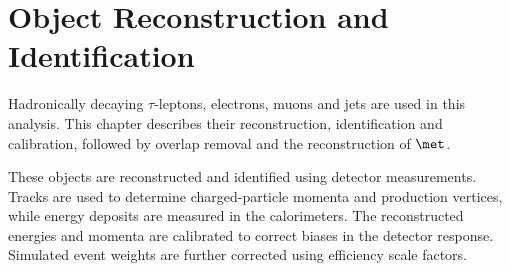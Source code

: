 \chapter{Object Reconstruction and Identification}
\label{chapter:object_reconstruction}

Hadronically decaying $\tau$-leptons, electrons, muons and jets are used in this analysis.
This chapter describes their reconstruction, identification and calibration, followed by overlap removal and the reconstruction of $\met$.

These objects are reconstructed and identified using detector measurements.
Tracks are used to determine charged-particle momenta and production vertices, while energy deposits are measured in the calorimeters.
The reconstructed energies and momenta are calibrated to correct biases in the detector response.
Simulated event weights are further corrected using efficiency scale factors.











